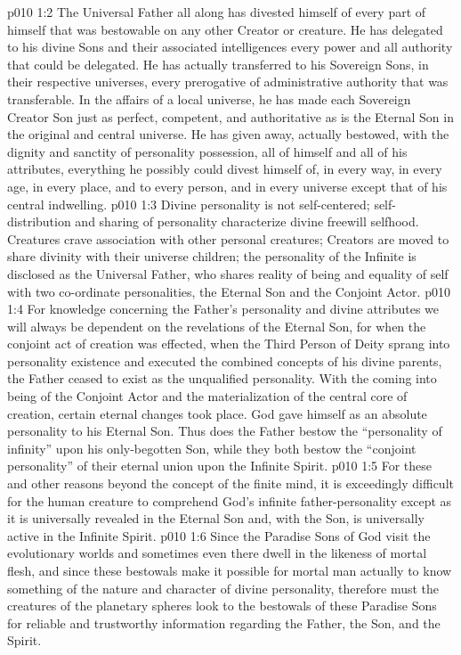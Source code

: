\vs p010 1:2 The Universal Father all along has divested himself of every part of himself that was bestowable on any other Creator or creature. He has delegated to his divine Sons and their associated intelligences every power and all authority that could be delegated. He has actually transferred to his Sovereign Sons, in their respective universes, every prerogative of administrative authority that was transferable. In the affairs of a local universe, he has made each Sovereign Creator Son just as perfect, competent, and authoritative as is the Eternal Son in the original and central universe. He has given away, actually bestowed, with the dignity and sanctity of personality possession, all of himself and all of his attributes, everything he possibly could divest himself of, in every way, in every age, in every place, and to every person, and in every universe except that of his central indwelling.
\pc \vs p010 1:3 Divine personality is not self\hyp{}centered; self\hyp{}distribution and sharing of personality characterize divine freewill selfhood. Creatures crave association with other personal creatures; Creators are moved to share divinity with their universe children; the personality of the Infinite is disclosed as the Universal Father, who shares reality of being and equality of self with two co\hyp{}ordinate personalities, the Eternal Son and the Conjoint Actor.
\pc \vs p010 1:4 For knowledge concerning the Father’s personality and divine attributes we will always be dependent on the revelations of the Eternal Son, for when the conjoint act of creation was effected, when the Third Person of Deity sprang into personality existence and executed the combined concepts of his divine parents, the Father ceased to exist as the unqualified personality. With the coming into being of the Conjoint Actor and the materialization of the central core of creation, certain eternal changes took place. God gave himself as an absolute personality to his Eternal Son. Thus does the Father bestow the “personality of infinity” upon his only\hyp{}begotten Son, while they both bestow the “conjoint personality” of their eternal union upon the Infinite Spirit.
\vs p010 1:5 For these and other reasons beyond the concept of the finite mind, it is exceedingly difficult for the human creature to comprehend God’s infinite father\hyp{}personality except as it is universally revealed in the Eternal Son and, with the Son, is universally active in the Infinite Spirit.
\vs p010 1:6 Since the Paradise Sons of God visit the evolutionary worlds and sometimes even there dwell in the likeness of mortal flesh, and since these bestowals make it possible for mortal man actually to know something of the nature and character of divine personality, therefore must the creatures of the planetary spheres look to the bestowals of these Paradise Sons for reliable and trustworthy information regarding the Father, the Son, and the Spirit.\plusone
